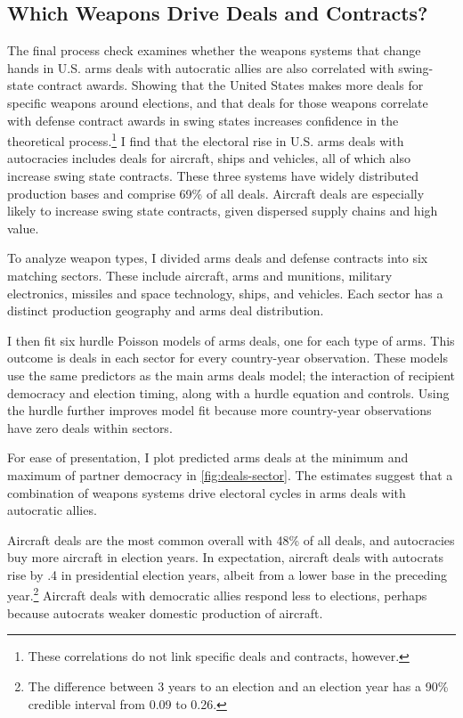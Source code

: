 \documentclass[12pt]{article}
\begin{document}
\subsection{Which Weapons Drive Deals and Contracts?} 


The final process check examines whether the weapons systems that change hands in U.S. arms deals with autocratic allies are also correlated with swing-state contract awards. 
Showing that the United States makes more deals for specific weapons around elections, and that deals for those weapons correlate with defense contract awards in swing states increases confidence in the theoretical process.\footnote{These correlations do not link specific deals and contracts, however.}
I find that the electoral rise in U.S. arms deals with autocracies includes deals for aircraft, ships and vehicles, all of which also increase swing state contracts. 
These three systems have widely distributed production bases and comprise 69\% of all deals. 
Aircraft deals are especially likely to increase swing state contracts, given dispersed supply chains and high value. 


To analyze weapon types, I divided arms deals and defense contracts into six matching sectors. 
These include aircraft, arms and munitions, military electronics, missiles and space technology, ships, and vehicles.  
Each sector has a distinct production geography and arms deal distribution.


I then fit six hurdle Poisson models of arms deals, one for each type of arms. 
This outcome is deals in each sector for every country-year observation. 
These models use the same predictors as the main arms deals model; the interaction of recipient democracy and election timing, along with a hurdle equation and controls.
Using the hurdle further improves model fit because more country-year observations have zero deals within sectors. 


For ease of presentation, I plot predicted arms deals at the minimum and maximum of partner democracy in \autoref{fig:deals-sector}.
The estimates suggest that a combination of weapons systems drive electoral cycles in arms deals with autocratic allies.  


Aircraft deals are the most common overall with 48\% of all deals, and autocracies buy more aircraft in election years.
In expectation, aircraft deals with autocrats rise by .4 in presidential election years, albeit from a lower base in the preceding year.\footnote{The difference between 3 years to an election and an election year has a 90\% credible interval from 0.09 to 0.26.}
Aircraft deals with democratic allies respond less to elections, perhaps because autocrats weaker domestic production of aircraft. 
\end{document}
